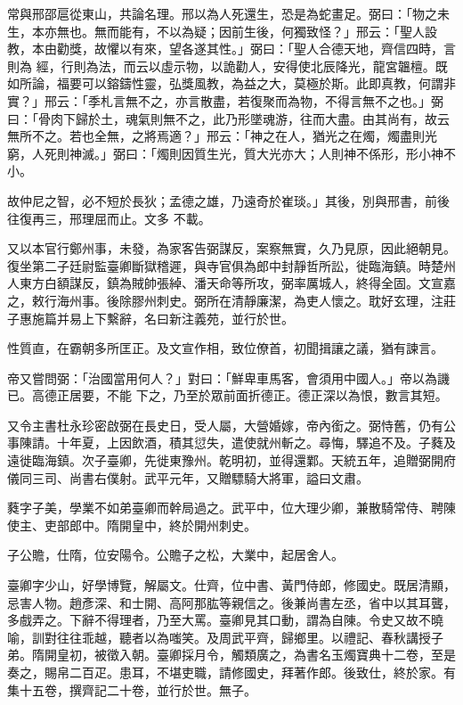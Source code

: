 \begin{pinyinscope}
 常與邢邵扈從東山，共論名理。邢以為人死還生，恐是為蛇畫足。弼曰：「物之未生，本亦無也。無而能有，不以為疑；因前生後，何獨致怪？」邢云：「聖人設教，本由勸獎，故懼以有來，望各遂其性。」弼曰：「聖人合德天地，齊信四時，言則為
 經，行則為法，而云以虛示物，以詭勸人，安得使北辰降光，龍宮韞檀。既如所論，福要可以鎔鑄性靈，弘獎風教，為益之大，莫極於斯。此即真教，何謂非實？」邢云：「季札言無不之，亦言散盡，若復聚而為物，不得言無不之也。」弼曰：「骨肉下歸於土，魂氣則無不之，此乃形墜魂游，往而大盡。由其尚有，故云無所不之。若也全無，之將焉適？」邢云：「神之在人，猶光之在燭，燭盡則光窮，人死則神滅。」弼曰：「燭則因質生光，質大光亦大；人則神不係形，形小神不小。



 故仲尼之智，必不短於長狄；孟德之雄，乃遠奇於崔琰。」其後，別與邢書，前後往復再三，邢理屈而止。文多
 不載。



 又以本官行鄭州事，未發，為家客告弼謀反，案察無實，久乃見原，因此絕朝見。復坐第二子廷尉監臺卿斷獄稽遲，與寺官俱為郎中封靜哲所訟，徙臨海鎮。時楚州人東方白額謀反，鎮為賊帥張綽、潘天命等所攻，弼率厲城人，終得全固。文宣嘉之，敕行海州事。後除膠州刺史。弼所在清靜廉潔，為吏人懷之。耽好玄理，注莊子惠施篇并易上下繫辭，名曰新注義苑，並行於世。



 性質直，在霸朝多所匡正。及文宣作相，致位僚首，初聞揖讓之議，猶有諫言。



 帝又嘗問弼：「治國當用何人？」對曰：「鮮卑車馬客，會須用中國人。」帝以為譏已。高德正居要，不能
 下之，乃至於眾前面折德正。德正深以為恨，數言其短。



 又令主書杜永珍密啟弼在長史日，受人屬，大營婚嫁，帝內銜之。弼恃舊，仍有公事陳請。十年夏，上因飲酒，積其愆失，遣使就州斬之。尋悔，驛追不及。子蕤及遠徙臨海鎮。次子臺卿，先徙東豫州。乾明初，並得還鄴。天統五年，追贈弼開府儀同三司、尚書右僕射。武平元年，又贈驃騎大將軍，謚曰文肅。



 蕤字子美，學業不如弟臺卿而幹局過之。武平中，位大理少卿，兼散騎常侍、聘陳使主、吏部郎中。隋開皇中，終於開州刺史。



 子公贍，仕隋，位安陽令。公贍子之松，大業中，起居舍人。



 臺卿字少山，好學博覽，解屬文。仕齊，位中書、黃門侍郎，修國史。既居清顯，忌害人物。趙彥深、和士開、高阿那肱等親信之。後兼尚書左丞，省中以其耳聾，多戲弄之。下辭不得理者，乃至大罵。臺卿見其口動，謂為自陳。令史又故不曉喻，訓對往往乖越，聽者以為嗤笑。及周武平齊，歸鄉里。以禮記、春秋講授子弟。隋開皇初，被徵入朝。臺卿採月令，觸類廣之，為書名玉燭寶典十二卷，至是奏之，賜帛二百疋。患耳，不堪吏職，請修國史，拜著作郎。後致仕，終於家。有集十五卷，撰齊記二十卷，並行於世。無子。




\end{pinyinscope}
